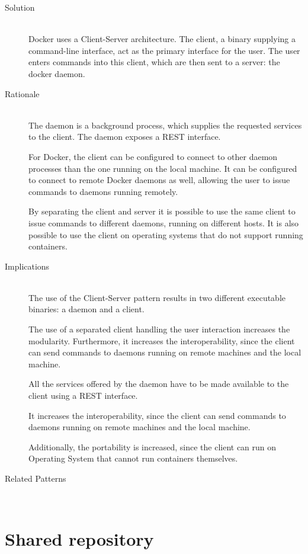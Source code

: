 \begin{description}
\item [Solution]~\\
Docker uses a Client-Server architecture. The client, a binary supplying a command-line interface, act as the primary interface for the user. The user enters commands into this client, which are then sent to a server: the docker daemon. 


\item [Rationale] ~\\
The daemon is a background process, which supplies the requested services to the client. The daemon exposes a REST interface.

For Docker, the client can be configured to connect to other daemon processes than the one running on the local machine. It can be configured to connect to remote Docker daemons as well, allowing the user to issue commands to daemons running remotely.


By separating the client and server it is possible to use the same client to issue commands to different daemons, running on different hosts.
It is also possible to use the client on operating systems that do not support running containers.

\item [Implications]~\\
The use of the Client-Server pattern results in two different executable binaries: a daemon and a client. 


The use of a separated client handling the user interaction increases the modularity.
Furthermore, it increases the interoperability, since the client can send commands to daemons running on remote machines and the local machine.

All the services offered by the daemon have to be made available to the client using a REST interface.

It increases the interoperability, since the client can send commands to daemons running on remote machines and the local machine.

Additionally, the portability is increased, since the client can run on Operating System that cannot run containers themselves.


\item [Related Patterns]~\\


\end{description}


\section{Shared repository}

